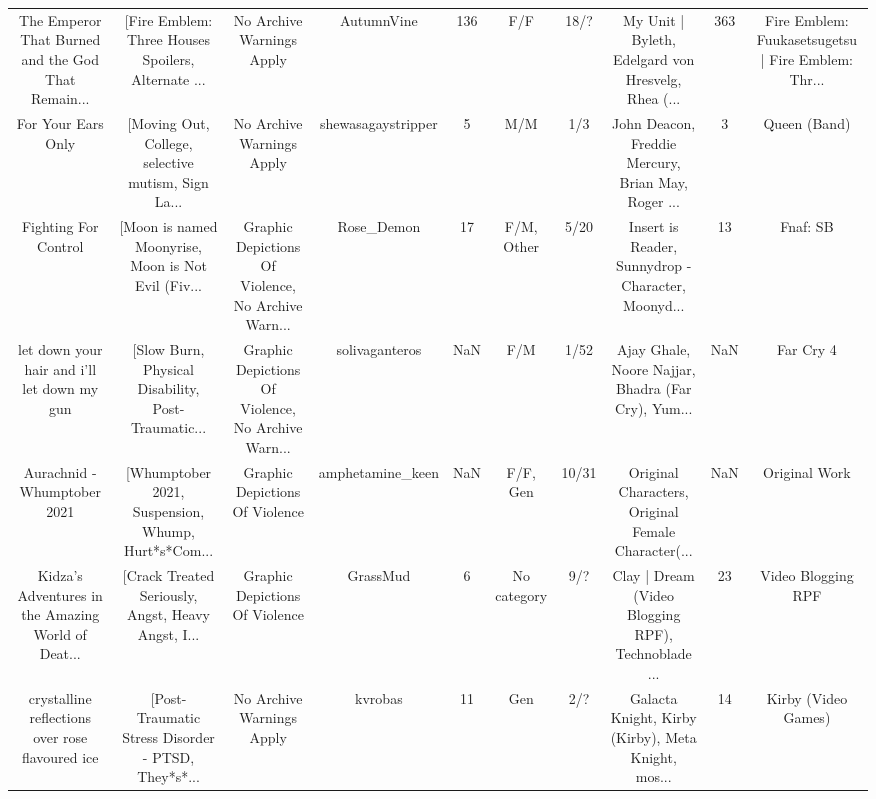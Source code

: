 \begin{table}[h!]
{\begin{tabular}{|c|c|c|c|c|c|c|c|c|c|}
The Emperor That Burned and the God That Remain... & [Fire Emblem: Three Houses Spoilers, Alternate ... &                          No Archive Warnings Apply &                         AutumnVine &       136 &                              F/F &     18/? & My Unit | Byleth, Edelgard von Hresvelg, Rhea (... &      363 & Fire Emblem: Fuukasetsugetsu | Fire Emblem: Thr... \\
                                For Your Ears Only & [Moving Out, College, selective mutism, Sign La... &                          No Archive Warnings Apply &                 shewasagaystripper &         5 &                              M/M &      1/3 & John Deacon, Freddie Mercury, Brian May, Roger ... &        3 &                                       Queen (Band) \\
                              Fighting For Control & [Moon is named Moonyrise, Moon is Not Evil (Fiv... & Graphic Depictions Of Violence, No Archive Warn... &                         Rose\_Demon &        17 &                       F/M, Other &     5/20 & Insert is Reader, Sunnydrop - Character, Moonyd... &       13 &                                           Fnaf: SB \\
       let down your hair and i'll let down my gun & [Slow Burn, Physical Disability, Post-Traumatic... & Graphic Depictions Of Violence, No Archive Warn... &                     solivaganteros &       NaN &                              F/M &     1/52 & Ajay Ghale, Noore Najjar, Bhadra (Far Cry), Yum... &      NaN &                                          Far Cry 4 \\
                       Aurachnid - Whumptober 2021 & [Whumptober 2021, Suspension, Whump, Hurt*s*Com... &                     Graphic Depictions Of Violence &                   amphetamine\_keen &       NaN &                         F/F, Gen &    10/31 & Original Characters, Original Female Character(... &      NaN &                                      Original Work \\
Kidza's Adventures in the Amazing World of Deat... & [Crack Treated Seriously, Angst, Heavy Angst, I... &                     Graphic Depictions Of Violence &                           GrassMud &         6 &                      No category &      9/? & Clay | Dream (Video Blogging RPF), Technoblade ... &       23 &                                 Video Blogging RPF \\
   crystalline reflections over rose flavoured ice & [Post-Traumatic Stress Disorder - PTSD, They*s*... &                          No Archive Warnings Apply &                            kvrobas &        11 &                              Gen &      2/? & Galacta Knight, Kirby (Kirby), Meta Knight, mos... &       14 &                                Kirby (Video Games) \\

\end{tabular}}
\end{table}
